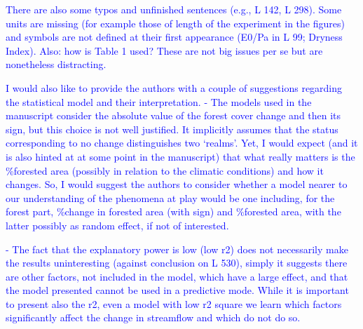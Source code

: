 \documentclass[]{elsarticle} %
\begin{document}
\textcolor{blue}{There are also some typos and unfinished sentences (e.g., L 142, L 298). Some units are missing (for example those of length of the experiment in the figures) and symbols are not defined at their first appearance (E0/Pa in L 99; Dryness Index). Also: how is Table 1 used? These are not big issues per se but are nonetheless distracting.}

\textcolor{blue}{I would also like to provide the authors with a couple of suggestions regarding the statistical model and their interpretation. 
- The models used in the manuscript consider the absolute value of the forest cover change and then its sign, but this choice is not well justified. It implicitly assumes that the status corresponding to no change distinguishes two ‘realms’. Yet, I would expect (and it is also hinted at at some point in the manuscript) that what really matters is the \%forested area (possibly in relation to the climatic conditions) and how it changes. So, I would suggest the authors to consider whether a model nearer to our understanding of the phenomena at play would be one including, for the forest part, \%change in forested area (with sign) and \%forested area, with the latter possibly as random effect, if not of interested.}

\textcolor{blue}{- The fact that the explanatory power is low (low r2) does not necessarily make the results uninteresting (against conclusion on L 530), simply it suggests there are other factors, not included in the model, which have a large effect, and that the model presented cannot be used in a predictive mode. While it is important to present also the r2, even a model with low r2 square we learn which factors significantly affect the change in streamflow and which do not do so.}
\end{document}
